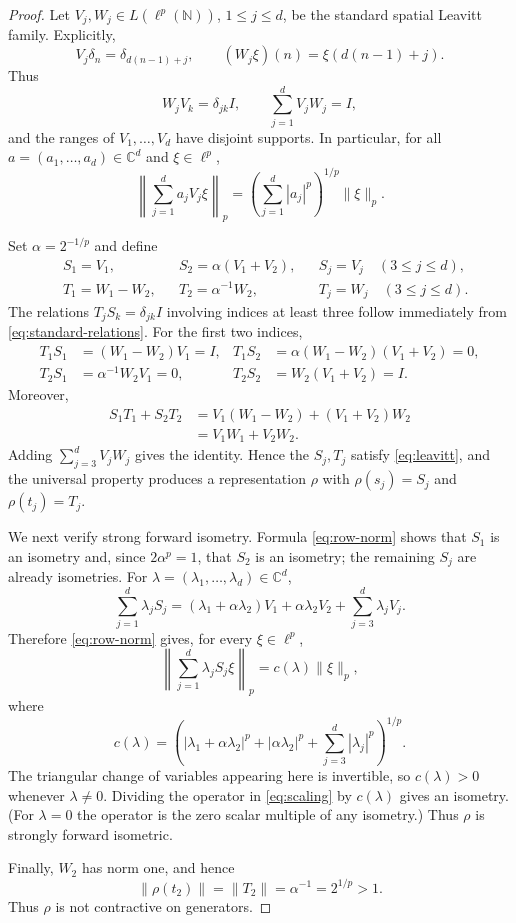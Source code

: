 \documentclass[11pt]{article}
\newcommand{\N}{\mathbb N}
\newcommand{\C}{\mathbb C}
\begin{document}
\begin{proof}
Let $V_j,W_j\in L(\ell^p(\N))$, $1\le j\le d$, be the standard spatial
Leavitt family. Explicitly,
\[
 V_j\delta_n=\delta_{d(n-1)+j},
 \qquad
 (W_j\xi)(n)=\xi(d(n-1)+j).
\]
Thus
\begin{equation}\label{eq:standard-relations}
 W_jV_k=\delta_{jk}I,
 \qquad
 \sum_{j=1}^dV_jW_j=I,
\end{equation}
and the ranges of $V_1,\ldots,V_d$ have disjoint supports. In particular,
for all $a=(a_1,\ldots,a_d)\in\C^d$ and $\xi\in\ell^p$,
\begin{equation}\label{eq:row-norm}
 \left\|\sum_{j=1}^d a_jV_j\xi\right\|_p
 =\left(\sum_{j=1}^d|a_j|^p\right)^{1/p}\|\xi\|_p.
\end{equation}

Set $\alpha=2^{-1/p}$ and define
\begin{align*}
 &S_1=V_1,
 &&S_2=\alpha(V_1+V_2),
 &&S_j=V_j \quad(3\le j\le d),\\
 &T_1=W_1-W_2,
 &&T_2=\alpha^{-1}W_2,
 &&T_j=W_j \quad(3\le j\le d).
\end{align*}
The relations $T_jS_k=\delta_{jk}I$ involving indices at least three follow
immediately from \eqref{eq:standard-relations}. For the first two indices,
\begin{align*}
 T_1S_1&=(W_1-W_2)V_1=I,
 &T_1S_2&=\alpha(W_1-W_2)(V_1+V_2)=0,\\
 T_2S_1&=\alpha^{-1}W_2V_1=0,
 &T_2S_2&=W_2(V_1+V_2)=I.
\end{align*}
Moreover,
\begin{align*}
 S_1T_1+S_2T_2
 &=V_1(W_1-W_2)+(V_1+V_2)W_2\\
 &=V_1W_1+V_2W_2.
\end{align*}
Adding $\sum_{j=3}^dV_jW_j$ gives the identity. Hence the $S_j,T_j$
satisfy \eqref{eq:leavitt}, and the universal property produces a
representation $\rho$ with $\rho(s_j)=S_j$ and $\rho(t_j)=T_j$.

We next verify strong forward isometry. Formula \eqref{eq:row-norm} shows that
$S_1$ is an isometry and, since $2\alpha^p=1$, that $S_2$ is an isometry;
the remaining $S_j$ are already isometries. For
$\lambda=(\lambda_1,\ldots,\lambda_d)\in\C^d$,
\[
 \sum_{j=1}^d\lambda_jS_j
 = (\lambda_1+\alpha\lambda_2)V_1
   +\alpha\lambda_2V_2
   +\sum_{j=3}^d\lambda_jV_j.
\]
Therefore \eqref{eq:row-norm} gives, for every $\xi\in\ell^p$,
\begin{equation}\label{eq:scaling}
 \left\|\sum_{j=1}^d\lambda_jS_j\xi\right\|_p
 =c(\lambda)\|\xi\|_p,
\end{equation}
where
\[
 c(\lambda)=
 \left(
 |\lambda_1+\alpha\lambda_2|^p
 +|\alpha\lambda_2|^p
 +\sum_{j=3}^d|\lambda_j|^p
 \right)^{1/p}.
\]
The triangular change of variables appearing here is invertible, so
$c(\lambda)>0$ whenever $\lambda\ne0$. Dividing the operator in
\eqref{eq:scaling} by $c(\lambda)$ gives an isometry. (For $\lambda=0$ the
operator is the zero scalar multiple of any isometry.) Thus $\rho$ is strongly
forward isometric.

Finally, $W_2$ has norm one, and hence
\[
 \|\rho(t_2)\|=\|T_2\|=\alpha^{-1}=2^{1/p}>1.
\]
Thus $\rho$ is not contractive on generators.
\end{proof}
\end{document}
